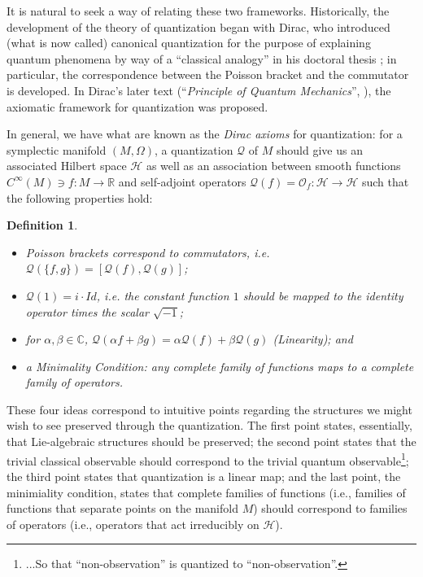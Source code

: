 \documentclass{tufte-handout}
\newtheorem{defn}{Definition}
\begin{document}
It is natural to seek a way of relating these two frameworks. Historically, the development of the theory of quantization began with Dirac, who introduced (what is now called) canonical quantization for the purpose of explaining quantum phenomena by way of a ``classical analogy'' in his doctoral thesis \cite{diracthesis}; in particular, the correspondence between the Poisson bracket and the commutator is developed. In Dirac's later text (``\emph{Principle of Quantum Mechanics}'', \cite{diracprinciples}), the axiomatic framework for quantization was proposed.

In general, we have what are known as the \emph{Dirac axioms} for quantization: for a symplectic manifold $(M,\Omega)$, a quantization $\mathcal{Q}$ of $M$ should give us an associated Hilbert space $\mathcal{H}$ as well as an association between smooth functions $C^\infty(M) \ni f: M \to \mathbb{R}$ and self-adjoint operators $\mathcal{Q}(f) = \mathcal{O}_f: \mathcal{H} \to \mathcal{H}$ such that the following properties hold:
\begin{defn}
\begin{itemize}
\item Poisson brackets correspond to commutators, i.e. $\mathcal{Q}(\{f,g\}) = [\mathcal{Q}(f),\mathcal{Q}(g)]$;
\item $\mathcal{Q}(1) = i \cdot Id$, i.e. the constant function $1$ should be mapped to the identity operator times the scalar $\sqrt{-1}$;
\item for $\alpha, \beta \in \mathbb{C}$, $\mathcal{Q}(\alpha f + \beta g) = \alpha \mathcal{Q}(f) + \beta \mathcal{Q}(g)$ \emph{(Linearity)}; and
\item a \emph{Minimality Condition}: any \emph{complete family} of functions maps to a \emph{complete family} of operators.
\end{itemize}
\end{defn}

These four ideas correspond to intuitive points regarding the structures we might wish to see preserved through the quantization. The first point states, essentially, that Lie-algebraic structures should be preserved; the second point states that the trivial classical observable should correspond to the trivial quantum observable\footnote{...So that ``non-observation'' is quantized to ``non-observation''.}; the third point states that quantization is a linear map; and the last point, the minimiality condition, states that complete families of functions (i.e., families of functions that separate points on the manifold $M$) should correspond to families of operators (i.e., operators that act irreducibly on $\mathcal{H}$).
\end{document}
